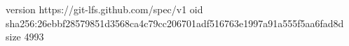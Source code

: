 version https://git-lfs.github.com/spec/v1
oid sha256:26ebbf28579851d3568ca4c79cc206701adf516763e1997a91a555f5aa6fad8d
size 4993
